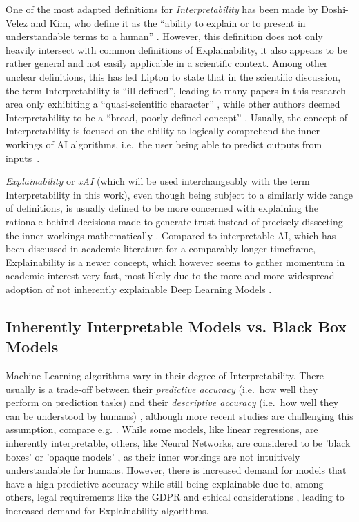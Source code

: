One of the most adapted definitions for \textit{Interpretability} has been made by Doshi-Velez and Kim, who define it as the “ability to explain or to present in understandable terms to a human” \parencite{DoshiVelez2017}. 
However, this definition does not only heavily intersect with common definitions of Explainability, it also appears to be rather general and not easily applicable in a scientific context. 
Among other unclear definitions, this has led Lipton to state that in the scientific discussion, the term Interpretability is “ill-defined”, leading to many papers in this research area only exhibiting a “quasi-scientific character” \parencite{Lipton2018}, while other authors deemed Interpretability to be a “broad, poorly defined concept” \parencite{Murdoch2019}. 
Usually, the concept of Interpretability is focused on the ability to logically comprehend the inner workings of AI algorithms, i.e.\ the user being able to predict outputs from inputs~\parencite{Kim2016}.

\textit{Explainability} or \textit{xAI} (which will be used interchangeably with the term Interpretability in this work), even though being subject to a similarly wide range of definitions, is usually defined to be more concerned with explaining the rationale behind decisions made to generate trust instead of precisely dissecting the inner workings mathematically \parencite{Gunning2019}. 
Compared to interpretable AI, which has been discussed in academic literature for a comparably longer timeframe, Explainability is a newer concept, which however seems to gather momentum in academic interest very fast, most likely due to the more and more widespread adoption of not inherently explainable Deep Learning Models \parencite{BarredoArrieta2020}.


\subsection{Inherently Interpretable Models vs. Black Box Models}\label{subsec:inherently}

Machine Learning algorithms vary in their degree of Interpretability. There usually is a trade-off between their \textit{predictive accuracy} (i.e.\ how well they perform on prediction tasks) and their \textit{descriptive accuracy} (i.e.\ how well they can be understood by humans) \parencite{Murdoch2019}, although more recent studies are challenging this assumption, compare e.g. \cite{Cooper2024}.
While some models, like linear regressions, are inherently interpretable, others, like Neural Networks, are considered to be 'black boxes' \parencite{Guidotti2018} or 'opaque models' \parencite{Burrell2016}, as their inner workings are not intuitively understandable for humans.
However, there is increased demand for models that have a high predictive accuracy while still being explainable due to, among others, legal requirements like the GDPR \parencite{GDPR} and ethical considerations \parencite{Guidotti2018}, leading to increased demand for Explainability algorithms.

